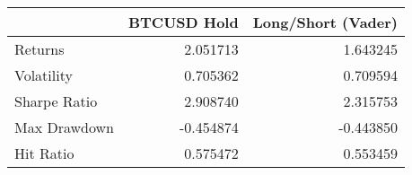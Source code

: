 \begin{tabular}{lrr}
\toprule
{} &  BTCUSD Hold &  Long/Short (Vader) \\
\midrule
Returns      &     2.051713 &            1.643245 \\
Volatility   &     0.705362 &            0.709594 \\
Sharpe Ratio &     2.908740 &            2.315753 \\
Max Drawdown &    -0.454874 &           -0.443850 \\
Hit Ratio    &     0.575472 &            0.553459 \\
\bottomrule
\end{tabular}
